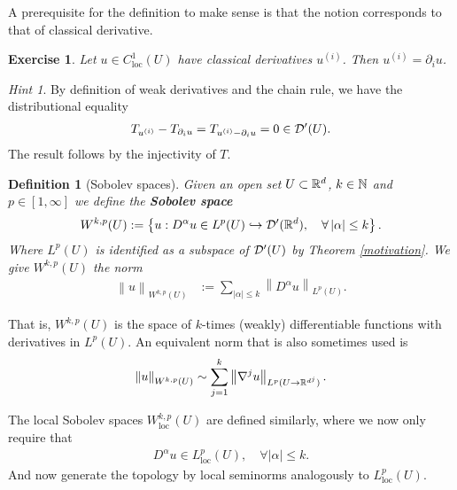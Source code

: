 \documentclass[12pt]{article}
\newtheorem{definition}{Definition}
\newtheorem{exercise}{Exercise}
\theoremstyle{remark}
\newtheorem*{hint}{Hint}
\renewcommand{\norm}[1]{\left\lVert #1 \right\rVert}\renewcommand{\abs}[1]{\left| #1 \right|}
\begin{document}
A prerequisite for the definition to make sense is that the notion corresponds to that of classical derivative.
\begin{exercise} Let $u \in C_{\mathrm{loc}}^1(U)$ have classical derivatives $u^{(i)}$. Then $u^{(i)}= \partial_i u $.
\end{exercise}
\begin{hint}
	By definition of weak derivatives and the chain rule, we have the distributional equality
	\begin{align*}
		T_{u^{(i)}}-T_{\partial _i u}=T_{u^{(i)}-\partial _i u}=0 \in \mathcal{D}'(U)   .
	\end{align*}
	The result follows by the injectivity of $T$.
\end{hint}
\begin{definition}[Sobolev spaces]\label{sobolev def}
	Given an open set $U \subset \mathbb{R}^d$, $k \in \mathbb{N}$ and $p \in [1,\infty]$  we define the \textbf{Sobolev space}
	\begin{align*}
		W^{k,p}(U):=\set{ u: D^{\alpha}u \in L^p(U) \hookrightarrow \Dd'(\R^d), \quad\forall \abs{\alpha}\leq k   } .
	\end{align*}
	Where $L^p(U)$ is identified as a subspace of  $\mathcal{D}'(U)$ by Theorem \ref{motivation}. We give $W^{k,p}(U)$ the norm
	\begin{align*}
		\norm{u}_{W^{k,p}(U)}&:=\sum_{\abs{\alpha}\leq k } \norm{D^\alpha u}_{L^p(U)}.        \end{align*}
\end{definition}
That is, $W^{k,p}(U)$ is the space of $k$-times (weakly) differentiable functions with derivatives in $L^p(U)$. An equivalent norm that is also sometimes used is
\begin{align*}
	\norm{u}_{W^{k,p}(U)}\sim \sum_{j=1}^k \norm{\nabla^j u}_{L^p(U\to \R^{d^j})} .
\end{align*}



The local Sobolev spaces $W^{k,p}_{\mathrm{loc}}(U)$ are defined similarly, where we now only require that
\begin{align*}
	D^\alpha u \in L^p_{\text{loc}}(U) , \quad\forall \abs{\alpha}\leq k .
\end{align*}
And now generate the topology by local seminorms analogously to $L^p_{\mathrm{loc}}(U)$.
\end{document}
